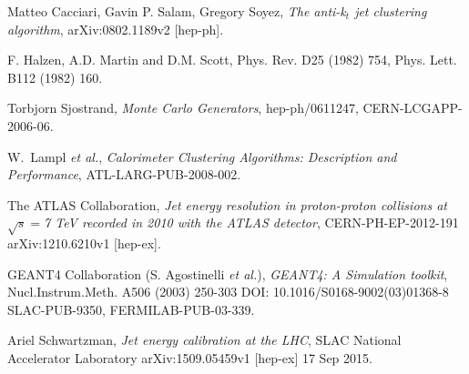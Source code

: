 \documentclass[UKenglish,texlive=2013]{\ATLASLATEXPATH atlasdoc}
\begin{document}
\begin{thebibliography}{9}





Matteo Cacciari, Gavin P. Salam, Gregory Soyez,
\emph{The anti-k$_t$ jet clustering algorithm},
arXiv:0802.1189v2 [hep-ph]. 

F. Halzen, A.D. Martin and D.M. Scott,  
Phys. Rev. D25 (1982) 754,
Phys. Lett. B112 (1982) 160.

Torbjorn Sjostrand,
\emph{Monte Carlo Generators},
hep-ph/0611247,
CERN-LCGAPP-2006-06.

W.~Lampl \emph{et al.},
\emph{Calorimeter Clustering Algorithms: Description and Performance},
ATL-LARG-PUB-2008-002.

The ATLAS Collaboration,
\emph{Jet energy resolution in proton-proton collisions at $\sqrt{s}=$7 TeV recorded in 2010 with the ATLAS detector},
CERN-PH-EP-2012-191
arXiv:1210.6210v1  [hep-ex].

GEANT4 Collaboration (S. Agostinelli \emph{et al.}), 
\emph{GEANT4: A Simulation toolkit},
Nucl.Instrum.Meth. A506 (2003) 250-303
DOI: 10.1016/S0168-9002(03)01368-8
SLAC-PUB-9350, FERMILAB-PUB-03-339.

Ariel Schwartzman,
\emph{Jet energy calibration at the LHC},
SLAC National Accelerator Laboratory
arXiv:1509.05459v1 [hep-ex] 17 Sep 2015.


\end{thebibliography}
\end{document}
